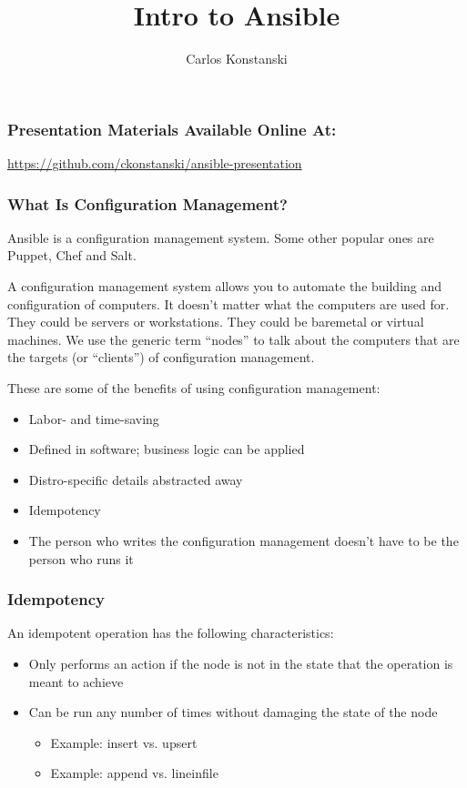 \documentclass[helvetica,english,utf8,notitle,nologo]{beamer}
\begin{document}
\title{Intro to Ansible}
\author{Carlos Konstanski}

\frame{\titlepage}

\begin{frame}
  \frametitle{Presentation Materials Available Online At:}
  \href{url}{https://github.com/ckonstanski/ansible-presentation}
\end{frame}



\begin{frame}
  \frametitle{What Is Configuration Management?}

  Ansible is a configuration management system. Some other popular
  ones are Puppet, Chef and Salt.

  A configuration management system allows you to automate the
  building and configuration of computers. It doesn't matter what the
  computers are used for. They could be servers or workstations. They
  could be baremetal or virtual machines. We use the generic term
  ``nodes'' to talk about the computers that are the targets (or
  ``clients'') of configuration management.

  These are some of the benefits of using configuration management:

  \begin{itemize}
  \item Labor- and time-saving
  \item Defined in software; business logic can be applied
  \item Distro-specific details abstracted away
  \item Idempotency
  \item The person who writes the configuration management doesn't
    have to be the person who runs it
  \end{itemize}
\end{frame}

\begin{frame}
  \frametitle{Idempotency}

  An idempotent operation has the following characteristics:

  \begin{itemize}
  \item Only performs an action if the node is not in the state that
    the operation is meant to achieve
  \item Can be run any number of times without damaging the state of
    the node
    \begin{itemize}
    \item Example: insert vs. upsert
    \item Example: append vs. lineinfile
    \end{itemize}
  \end{itemize}
\end{frame}
\end{document}
